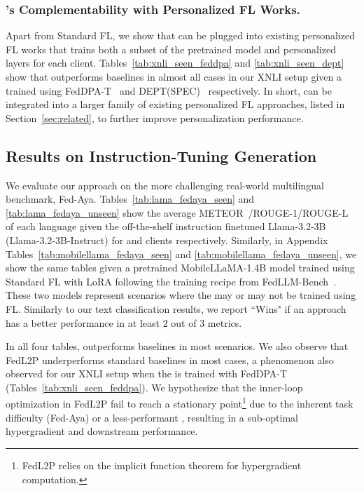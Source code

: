 \subsubsection{\method{}'s Complementability with Personalized FL Works.}\label{sec:eval_complement}





Apart from Standard FL, we show that \method{} can be plugged into existing personalized FL works that trains both a subset of the pretrained model and personalized layers for each client. Tables~\ref{tab:xnli_seen_feddpa} and \ref{tab:xnli_seen_dept} show that \method{} outperforms baselines in almost all cases in our XNLI setup given a \basemodel{} trained using FedDPA-T~\cite{FedDPA} and DEPT(SPEC)~\cite{DEPT} respectively. In short, \method{} can be integrated into a larger family of existing personalized FL approaches, listed in Section~\ref{sec:related}, to further improve personalization performance. 





\subsection{Results on Instruction-Tuning Generation}\label{sec:ift_gen}

We evaluate our approach on the more challenging real-world multilingual benchmark, Fed-Aya. Tables~\ref{tab:lama_fedaya_seen} and \ref{tab:lama_fedaya_unseen} show the average METEOR~\cite{meteor}/ROUGE-1/ROUGE-L~\cite{ROUGE} of each language given the off-the-shelf instruction finetuned Llama-3.2-3B (Llama-3.2-3B-Instruct) for \seen{} and \unseen{} clients respectively. Similarly, in Appendix Tables~\ref{tab:mobilellama_fedaya_seen} and \ref{tab:mobilellama_fedaya_unseen}, we show the same tables given a pretrained MobileLLaMA-1.4B model  trained using Standard FL with LoRA following the training recipe from FedLLM-Bench~\cite{fedllm-bench}. These two models represent scenarios where the \basemodel{} may or may not be trained using FL. Similarly to our text classification results, we report ``Wins" if an approach has a better performance in at least $2$ out of $3$ metrics. 

In all four tables, \method{} outperforms baselines in most scenarios. We also observe that FedL2P underperforms standard baselines in most cases, a phenomenon also observed for our XNLI setup when the \basemodel{} is trained with FedDPA-T (Tables~\ref{tab:xnli_seen_feddpa}). We hypothesize that the inner-loop optimization in FedL2P fail to reach a stationary point\footnote{FedL2P relies on the implicit function theorem for hypergradient computation.} due to the inherent task difficulty (Fed-Aya) or a less-performant \basemodel{}, resulting in a sub-optimal hypergradient and downstream performance. 


